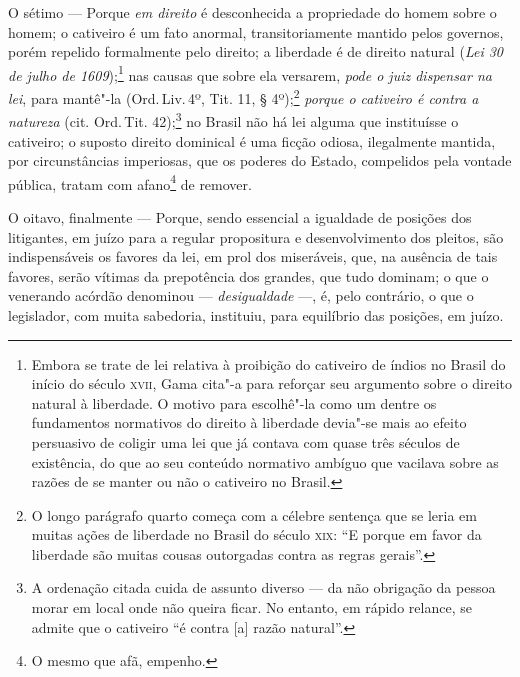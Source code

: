 O sétimo --- Porque \emph{em direito} é desconhecida a propriedade do
homem sobre o homem; o cativeiro é um fato anormal, transitoriamente
mantido pelos governos, porém repelido formalmente pelo direito; a
liberdade é de direito natural (\emph{Lei 30 de julho de
1609});\footnote{Embora se trate de lei relativa à proibição do
  cativeiro de índios no Brasil do início do século \textsc{xvii}, Gama cita"-a
  para reforçar seu argumento sobre o direito natural à liberdade. O
  motivo para escolhê"-la como um dentre os fundamentos normativos do
  direito à liberdade devia"-se mais ao efeito persuasivo de coligir uma
  lei que já contava com quase três séculos de existência, do que ao seu
  conteúdo normativo ambíguo que vacilava sobre as razões de se manter
  ou não o cativeiro no Brasil.} nas causas que sobre ela versarem,
\emph{pode o juiz dispensar na lei}, para mantê"-la (Ord.\,Liv.\,4º, Tit.
11, § 4º);\footnote{O longo parágrafo quarto começa com a célebre
  sentença que se leria em muitas ações de liberdade no Brasil do século
  \textsc{xix}: ``E porque em favor da liberdade são muitas cousas outorgadas
  contra as regras gerais''.} \emph{porque o cativeiro é contra a
natureza} (cit. Ord.\,Tit. 42);\footnote{A ordenação citada cuida de
  assunto diverso --- da não obrigação da pessoa morar em local onde não
  queira ficar. No entanto, em rápido relance, se admite que o cativeiro
  ``é contra {[}a{]} razão natural''.} no Brasil não há lei alguma que
instituísse o cativeiro; o suposto direito dominical é uma ficção
odiosa, ilegalmente mantida, por circunstâncias imperiosas, que os
poderes do Estado, compelidos pela vontade pública, tratam com
afano\footnote{O mesmo que afã, empenho.} de remover.

O oitavo, finalmente --- Porque, sendo essencial a igualdade de
posições dos litigantes, em juízo para a regular propositura e
desenvolvimento dos pleitos, são indispensáveis os favores da lei, em
prol dos miseráveis, que, na ausência de tais favores, serão vítimas da
prepotência dos grandes, que tudo dominam; o que o venerando acórdão
denominou --- \emph{desigualdade} ---, é, pelo contrário, o que o
legislador, com muita sabedoria, instituiu, para equilíbrio das
posições, em juízo.

\asterisc

